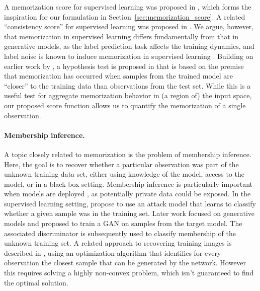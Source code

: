 \documentclass{article}
\begin{document}
A memorization score for supervised learning was proposed in 
\cite{feldman2019does}, which forms the inspiration for our formulation in 
Section~\ref{sec:memorization_score}. A related ``consistency score'' for 
supervised learning was proposed in \cite{jiang2021characterizing}.  We argue, 
however, that memorization in supervised learning differs fundamentally from 
that in generative models, as the label prediction task affects the training 
dynamics, and label noise is known to induce memorization in supervised 
learning \cite{liu2020early,xia2021robust}. Building on earlier work by 
\cite{lopez2016revisiting,xu2018empirical}, a hypothesis test is proposed in 
\cite{meehan2020non} that is based on the premise that memorization has 
occurred when samples from the trained model are ``closer'' to the training 
data than observations from the test set. While this is a useful test for 
aggregate memorization behavior in (a region of) the input space, our proposed 
score function allows us to quantify the memorization of a single observation.

\paragraph{Membership inference.} A topic closely related to memorization is 
the problem of membership inference. Here, the goal is to recover whether a 
particular observation was part of the unknown training data set, either using 
knowledge of the model, access to the model, or in a black-box setting.  
Membership inference is particularly important when models are deployed 
\cite{fredrikson2015model}, as potentially private data could be exposed. In 
the supervised learning setting, \cite{shokri2017membership} propose to use an 
attack model that learns to classify whether a given sample was in the 
training set. Later work \cite{hitaj2017deep,hayes2019logan} focused on 
generative models and proposed to train a GAN on samples from the target 
model.  The associated discriminator is subsequently used to classify 
membership of the unknown training set. A related approach to recovering 
training images is described in \cite{webster2019detecting}, using an 
optimization algorithm that identifies for every observation the closest 
sample that can be generated by the network.  However this requires solving a 
highly non-convex problem, which isn't guaranteed to find the optimal 
solution.
\end{document}
